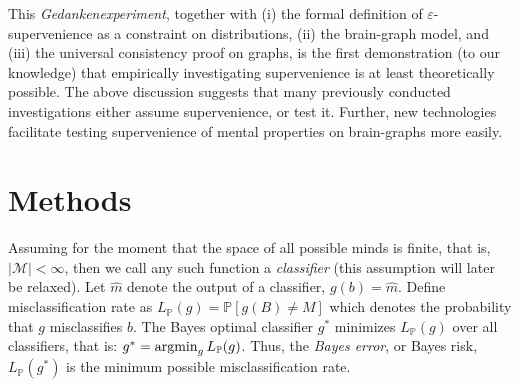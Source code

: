 \documentclass{article}
\newcommand{\mM}{\mathcal{M}}
\newcommand{\PP}{\mathbb{P}}           %
\providecommand{\mh}[1]{\widehat{#1}}
\newcommand{\argmin}{\operatornamewithlimits{argmin}}
\begin{document}
This \emph{Gedankenexperiment}, together with (i) the formal definition of $\varepsilon$-supervenience as a constraint on distributions, (ii) the brain-graph model, and (iii) the universal consistency proof on graphs, is the first demonstration (to our knowledge) that empirically investigating supervenience is at least theoretically possible. The above discussion suggests that many previously conducted investigations either assume supervenience, or test it.  Further, new technologies facilitate testing supervenience of mental properties on brain-graphs more easily.


\section*{Methods}
\label{sec:methods}






Assuming for the moment that the space of all possible minds is finite, that is, $|\mM| < \infty$, then we call any such function a \emph{classifier} (this assumption will later be relaxed).  Let $\mh{m}$ denote the output of a classifier, $g(b)=\mh{m}$.  Define misclassification rate as $L_{\PP}(g) = \PP[g(B) \neq M]$ which denotes the probability that $g$ misclassifies $b$. The Bayes optimal classifier $g^*$ minimizes $L_{\PP}(g)$ over all classifiers, that is:	
$g^* = \argmin_{g} L_{\PP}(g)$.
Thus, the \emph{Bayes error}, or Bayes risk, $L_{\PP}(g^*)$ is the minimum possible misclassification rate.
\end{document}
